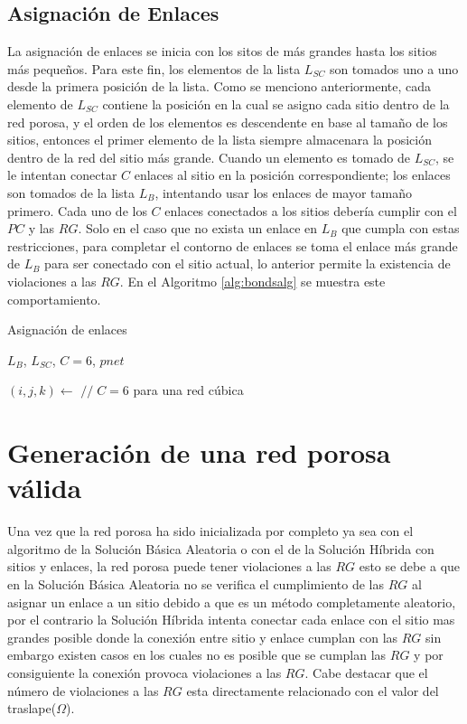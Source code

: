 \subsection{Asignación de Enlaces}
\label{subsec:sbonds}
La asignación de enlaces se inicia con los sitos de más grandes hasta los sitios más pequeños. Para este fin, los elementos de la lista $L_{SC}$ son tomados uno a uno desde la primera posición de la lista. Como se menciono anteriormente, cada elemento de $L_{SC}$ contiene la posición en la cual se asigno cada sitio dentro de la red porosa, y el orden de los elementos es descendente en base al tamaño de los sitios, entonces el primer elemento de la lista siempre almacenara la posición dentro de la red del sitio más grande. Cuando un elemento es tomado de $L_{SC}$, se le intentan conectar $C$ enlaces al sitio en la posición correspondiente; los enlaces son tomados de la lista $L_B$, intentando usar los enlaces de mayor tamaño primero. Cada uno de los $C$ enlaces conectados a los sitios debería cumplir con el $PC$ y las $RG$. Solo en el caso que no exista un enlace en $L_B$ que cumpla con estas restricciones, para completar el contorno de enlaces se toma el enlace más grande de $L_B$ para ser conectado con el sitio actual, lo anterior permite la existencia de violaciones a las $RG$. En el Algoritmo \ref{alg:bondsalg} se muestra este comportamiento.\\

\begin{algorithm}
\caption{Asignación de enlaces}\label{alg:bondsalg}
\begin{algorithmic}[1]
\Require $L_B$, $L_{SC}$, $C=6$, $pnet$

	\State $(i,j,k)\gets $
	 {$//\;C=6$ para una red cúbica}
		\State {}
	\EndFor
\EndWhile
\end{algorithmic}
\end{algorithm}

\section{Generación de una red porosa válida}
\label{sec:svalid}


Una vez que la red porosa ha sido inicializada por completo ya sea con el algoritmo de la Solución Básica Aleatoria o con el de la Solución Híbrida con sitios y enlaces, la red porosa puede tener violaciones a las $RG$ esto se debe a que en la Solución Básica Aleatoria no se verifica el cumplimiento de las $RG$ al asignar un enlace a un sitio debido a que es un método completamente aleatorio, por el contrario la Solución Híbrida intenta conectar cada enlace con el sitio mas grandes posible donde la conexión entre sitio y enlace cumplan con las $RG$ sin embargo existen casos en los cuales no es posible que se cumplan las $RG$ y por consiguiente la conexión provoca violaciones a las $RG$. Cabe destacar que el número de violaciones a las $RG$ esta directamente relacionado con el valor del traslape($\Omega$).\\

